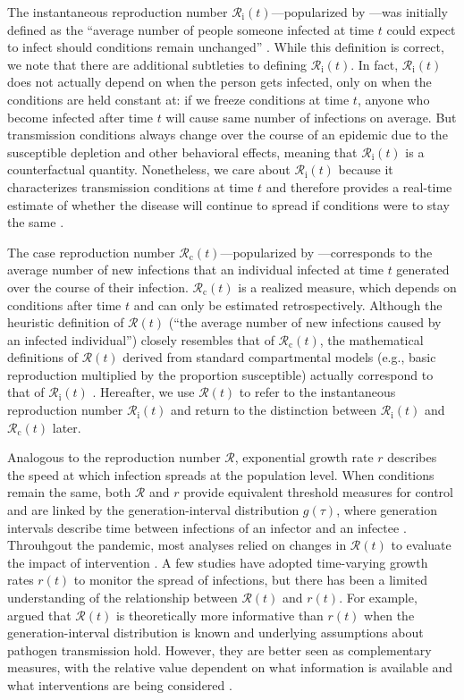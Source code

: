 \documentclass[12pt]{article}
\newcommand{\Rx}[1]{\ensuremath{{\mathcal R}_{#1}}\xspace}
\newcommand{\Rc}{\Rx{\mathrm{c}}}
\newcommand{\Ri}{\Rx{\mathrm{i}}}
\newcommand{\RR}{\ensuremath{{\mathcal R}}\xspace}
\begin{document}
The instantaneous reproduction number $\Ri(t)$---popularized by \cite{cori2013new}---was initially defined as the ``average number of people someone infected at time $t$ could expect to infect should conditions remain unchanged'' \citep{fraser2007estimating}. 
While this definition is correct, we note that there are additional subtleties to defining $\Ri(t)$.
In fact, $\Ri(t)$ does not actually depend on when the person gets infected, only on when the conditions are held constant at: if we freeze conditions at time $t$, anyone who become infected after time $t$ will cause same number of infections on average.
But transmission conditions always change over the course of an epidemic due to the susceptible depletion and other behavioral effects, meaning that $\Ri(t)$ is a counterfactual quantity.
Nonetheless, we care about $\Ri(t)$ because it characterizes transmission conditions at time $t$ and therefore provides a real-time estimate of whether the disease will continue to spread if conditions were to stay the same \citep{gostic2020practical}.

The case reproduction number $\Rc(t)$---popularized by \cite{wallinga2004different}---corresponds to the average number of new infections that an individual infected at time $t$ generated over the course of their infection.
$\Rc(t)$ is a realized measure, which depends on conditions after time $t$ and can only be estimated retrospectively.
Although the heuristic definition of $\RR(t)$ (``the average number of new infections caused by an infected individual'') closely resembles that of $\Rc(t)$, the mathematical definitions of $\RR(t)$ derived from standard compartmental models (e.g., basic reproduction multiplied by the proportion susceptible) actually correspond to that of $\Ri(t)$ \citep{gostic2020practical}.
Hereafter, we use $\RR(t)$ to refer to the instantaneous reproduction number $\Ri(t)$ and return to the distinction between $\Ri(t)$ and $\Rc(t)$ later.

Analogous to the reproduction number $\RR$, exponential growth rate $r$ describes the speed at which infection spreads at the population level.
When conditions remain the same, both $\RR$ and $r$ provide equivalent threshold measures for control and are linked by the generation-interval distribution $g(\tau)$, where generation intervals describe time between infections of an infector and an infectee \citep{svensson2007note}.
Throuhgout the pandemic, most analyses relied on changes in $\RR(t)$ to evaluate the impact of intervention \citep{flaxman2020estimating,brauner2021inferring}.
A few studies have adopted time-varying growth rates $r(t)$ to monitor the spread of infections, but there has been a limited understanding of the relationship between $\RR(t)$ and $r(t)$.
For example, \cite{parag2022} argued that $\RR(t)$ is theoretically more informative than $r(t)$ when the generation-interval distribution is known and underlying assumptions about pathogen transmission hold.
However, they are better seen as complementary measures, with the relative value dependent on what information is available and what interventions are being considered \citep{dushoff2021speed}.
\end{document}
